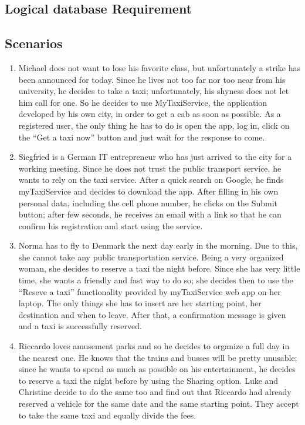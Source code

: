 \subsection{Logical database Requirement}

\subsection{Scenarios}
\begin{enumerate}
\item Michael does not want to lose his favorite class, but unfortunately a strike has been announced for today. Since he lives not too far nor too near from his university, he decides to take a taxi; unfortunately, his shyness does not let him call for one. So he decides to use MyTaxiService, the application developed by his own city, in order to get a cab as soon as possible. As a registered user, the only thing he has to do is open the app, log in, click on the “Get a taxi now” button and just wait for the response to come.

\item Siegfried is a German IT entrepreneur who has just arrived to the city for a working meeting. Since he does not trust the public transport service, he wants to rely on the taxi service. After a quick search on Google, he finds myTaxiService and decides to download the app. After filling in his own personal data, including the cell phone number, he clicks on the Submit button; after few seconds, he receives an email with a link so that he can confirm his registration and start using the service. 

\item Norma has to fly to Denmark the next day early in the morning. Due to this, she cannot take any public transportation service. Being a very organized woman, she decides to reserve a taxi the night before. Since she has very little time, she wants a friendly and fast way to do so; she decides then to use the “Reseve a taxi” functionality provided by myTaxiService web app on her laptop. The only things she has to insert are her starting point, her destination and when to leave. After that, a confirmation message is given and a taxi is successfully reserved.

\item Riccardo loves amusement parks and so he decides to organize a full day in the nearest one. He knows that the trains and busses will be pretty unusable; since he wants to spend as much as possible on his entertainment, he decides to reserve a taxi the night before by using the Sharing option. Luke and Christine decide to do the same too and find out that Riccardo had already reserved a vehicle for the same date and the same starting point. They accept to take the same taxi and equally divide the fees.


\end{enumerate}
